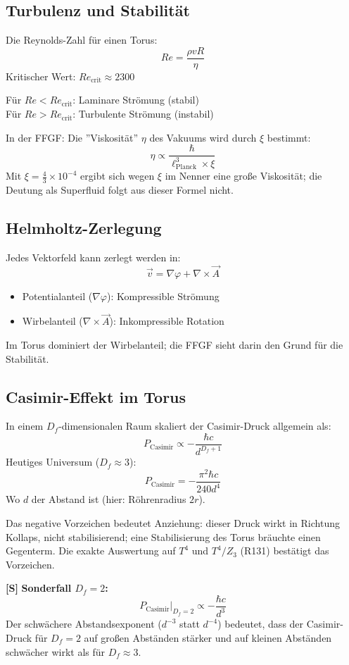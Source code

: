 	\subsection{Turbulenz und Stabilität}
	Die Reynolds-Zahl für einen Torus:
	\[
	Re = \frac{\rho v R}{\eta}
	\]
	Kritischer Wert: \( Re_{\text{crit}} \approx 2300 \)
	
	Für \( Re < Re_{\text{crit}} \): Laminare Strömung (stabil) \\
	Für \( Re > Re_{\text{crit}} \): Turbulente Strömung (instabil)
	
	In der FFGF:
	Die ''Viskosität'' \( \eta \) des Vakuums wird durch \( \xi \) bestimmt:
	\[
	\eta \propto \frac{\hbar}{\ell_{\text{Planck}}^3 \times \xi}
	\]
	Mit \( \xi = \frac{4}{3} \times 10^{-4} \) ergibt sich wegen $\xi$ im Nenner eine große Viskosität; die Deutung als Superfluid folgt aus dieser Formel nicht.
	
	\subsection{Helmholtz-Zerlegung}
	Jedes Vektorfeld kann zerlegt werden in:
	\[
	\vec{v} = \nabla \varphi + \nabla \times \vec{A}
	\]
	\begin{itemize}
		\item Potentialanteil (\( \nabla \varphi \)): Kompressible Strömung
		\item Wirbelanteil (\( \nabla \times \vec{A} \)): Inkompressible Rotation
	\end{itemize}
	
	Im Torus dominiert der Wirbelanteil; die FFGF sieht darin den Grund für die Stabilität.
	
	\subsection{Casimir-Effekt im Torus}
	In einem $D_f$-dimensionalen Raum skaliert der Casimir-Druck allgemein als:
	\[
	P_{\text{Casimir}} \propto -\frac{\hbar c}{d^{D_f+1}}
	\]
	Heutiges Universum (\( D_f \approx 3 \)):
	\[
	P_{\text{Casimir}} = -\frac{\pi^2 \hbar c}{240 d^4}
	\]
	Wo \( d \) der Abstand ist (hier: Röhrenradius \( 2r \)).

	Das negative Vorzeichen bedeutet Anziehung: dieser Druck wirkt in Richtung Kollaps, nicht stabilisierend; eine Stabilisierung des Torus bräuchte einen Gegenterm. Die exakte Auswertung auf $T^4$ und $T^4/Z_3$ (R131) bestätigt das Vorzeichen.

	\textbf{[S]} \textbf{Sonderfall \(D_f = 2\):}
	\[
	P_{\text{Casimir}}\big|_{D_f=2} \propto -\frac{\hbar c}{d^3}
	\]
	Der schwächere Abstandsexponent ($d^{-3}$ statt $d^{-4}$) bedeutet, dass der Casimir-Druck für $D_f = 2$ auf großen Abständen stärker und auf kleinen Abständen schwächer wirkt als für $D_f \approx 3$.

